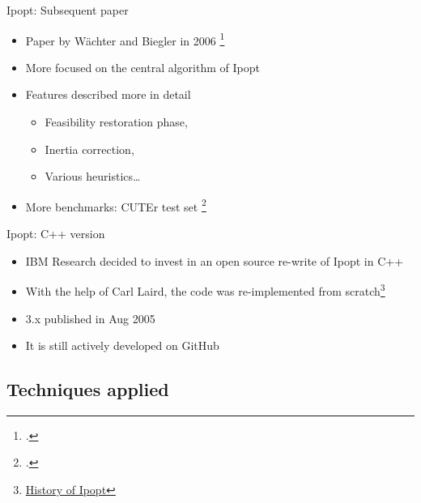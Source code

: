 \documentclass{beamer}
\begin{document}
\begin{frame}{Ipopt: Subsequent paper}

  \begin{itemize}
    \item Paper by Wächter and Biegler in 2006 \footcite{wachter2006implementation}
    \item More focused on the central algorithm of Ipopt
    \item Features described more in detail
          \begin{itemize}
            \item Feasibility restoration phase,
            \item Inertia correction,
            \item Various heuristics\dots
          \end{itemize}
    \item More benchmarks: CUTEr test set \footcite{gould2003cuter}
  \end{itemize}

\end{frame}

\begin{frame}{Ipopt: C++ version}

  \begin{itemize}
    \item IBM Research decided to invest in an open source re-write of Ipopt in C++
    \item With the help of Carl Laird, the code was re-implemented from scratch\footnote{\tiny \href{https://coin-or.github.io/Ipopt/\#HISTORY\_IPOPT}{History of Ipopt} }
    \item 3.x published in Aug 2005
    \item It is still actively developed on GitHub
  \end{itemize}

\end{frame}

\subsection{Techniques applied}
\end{document}
